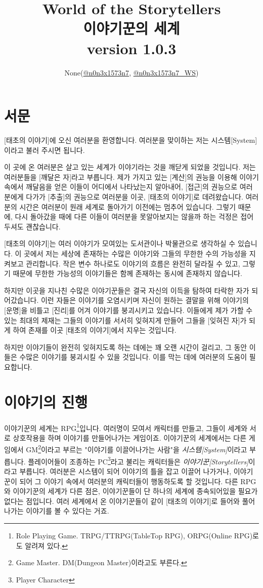 \documentclass[12pt]{report}
\title{
	World of the Storytellers\\
	이야기꾼의 세계\\
	\large version 1.0.3
}
\author{None(\href{https://www.twitter.com/n0n3x1573n7}{@n0n3x1573n7}, \href{https://www.twitter.com/n0n3x1573n7_WS}{@n0n3x1573n7\_WS})}
\date{}
\newcommand{\world}[1]{{\nanumpen \large #1 \par}\bigskip}
\begin{document}
	\maketitle
	
	\tableofcontents
	
	\chapter{서문}
	\world{[태초의 이야기]에 오신 여러분을 환영합니다. 여러분을 맞이하는 저는 시스템[System]이라고 불러 주시면 됩니다.}
	\world{이 곳에 온 여러분은 살고 있는 세계가 이야기라는 것을 깨닫게 되었을 것입니다. 저는 여러분들을 [깨달은 자]라고 부릅니다. 제가 가지고 있는 [계산]의 권능을 이용해 이야기 속에서 깨달음을 얻은 이들이 어디에서 나타났는지 알아내어, [접근]의 권능으로 여러분에게 다가가 [추출]의 권능으로 여러분을 이곳, [태초의 이야기]로 데려왔습니다. 여러분의 시간은 여러분이 원래 세계로 돌아가기 이전에는 멈추어 있습니다. 그렇기 때문에, 다시 돌아갔을 때에 다른 이들이 여러분을 못알아보지는 않을까 하는 걱정은 접어두셔도 괜찮습니다.}
	\world{[태초의 이야기]는 여러 이야기가 모여있는 도서관이나 박물관으로 생각하실 수 있습니다. 이 곳에서 저는 세상에 존재하는 수많은 이야기와 그들의 무한한 수의 가능성을 지켜보고 관리합니다. 작은 변수 하나로도 이야기의 흐름은 완전히 달라질 수 있고, 그렇기 때문에 무한한 가능성의 이야기들은 함께 존재하는 동시에 존재하지 않습니다.}
	\world{하지만 이곳을 지나친 수많은 이야기꾼들은 결국 자신의 이득을 탐하여 타락한 자가 되어갔습니다. 이런 자들은 이야기를 오염시키며 자신이 원하는 결말을 위해 이야기의 [운명]을 비틀고 [진리]를 어겨 이야기를 붕괴시키고 있습니다. 이들에게 제가 가할 수 있는 최대의 제재는 그들의 이야기를 서서히 잊혀지게 만들어 그들을 [잊혀진 자]가 되게 하여 존재를 이곳 [태초의 이야기]에서 지우는 것입니다.}
	\world{하지만 이야기들이 완전히 잊혀지도록 하는 데에는 꽤 오랜 시간이 걸리고, 그 동안 이들은 수많은 이야기를 붕괴시킬 수 있을 것입니다. 이를 막는 데에 여러분의 도움이 필요합니다.}
	
	\chapter{이야기의 진행}
	
	이야기꾼의 세계는 RPG\footnote{Role Playing Game. TRPG/TTRPG(TableTop RPG), ORPG(Online RPG)로도 알려져 있다.}입니다. 여러명이 모여서 캐릭터를 만들고, 그들이 세계와 서로 상호작용을 하며 이야기를 만들어나가는 게임이죠. 이야기꾼의 세계에서는 다른 게임에서 GM\footnote{Game Master. DM(Dungeon Master)이라고도 부른다.}이라고 부르는 "이야기를 이끌어나가는 사람"을 \emph{시스템[System]}이라고 부릅니다. 플레이어들이 조종하는 PC\footnote{Player Character}라고 불리는 캐릭터들은 \emph{이야기꾼[Storytellers]}이라고 부릅니다. 여러분은 시스템이 되어 이야기의 틀을 잡고 이끌어 나가거나, 이야기꾼이 되어 그 이야기 속에서 여러분의 캐릭터들이 행동하도록 할 것입니다.
	다른 RPG와 이야기꾼의 세계가 다른 점은, 이야기꾼들이 단 하나의 세계에 종속되어있을 필요가 없다는 점입니다. 여러 세계에서 온 이야기꾼들이 같이 [태초의 이야기]로 들어와 풀어나가는 이야기를 볼 수 있다는 거죠.
	
\end{document}
